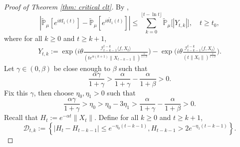 \documentclass[12pt,a4paper]{amsart}
\theoremstyle{plain}
\theoremstyle{definition}
\numberwithin{equation}{section}
\begin{document}
\begin{proof}[Proof of Theorem \ref{thm: critical clt}]
  By \cite[Lemma 3.4.3]{Durrett2010Probability},
  \begin{equation}
    \label{ineq: control of I1t}
    |\mathbb{\widetilde{P}}_{\mu}[e^{i\theta I_1(t)}] - \mathbb{\widetilde{P}}_{\mu} [e^{i\theta\widetilde{I}_1(t)}]|
    \leq \sum_{k=0}^{\lfloor t-\ln t \rfloor}\mathbb{\widetilde{P}}_{\mu}\big[|Y_{t,k}|\big],
    \quad t\geq t_0,
  \end{equation}
  where for all $k \geq 0$ and $t\geq k+1$,
  \begin{align}
    Y_{t,k}
    :=\exp\Big(i\theta\frac{\mathcal I_{t-k-1}^{t-k}\langle f ,X_t\rangle}{(t e^{\alpha(k+1)}\|X_{t-k-1}\|)^{\frac{1}{1+\beta}}}\Big)-\exp\Big(i\theta\frac{\mathcal I_{t-k-1}^{t-k}\langle f ,X_t\rangle}{(t\|X_t\|)^{\frac{1}{1+\beta}}}\Big).
  \end{align}
  Let $\gamma \in (0,\beta)$ be close enough to $\beta$ such that
  \[
    \frac{\alpha \gamma}{1+\gamma} > \frac{\alpha}{1+\gamma} - \frac{\alpha}{1+\beta} > 0.
  \]
  Fix this $\gamma$, then choose $\eta_0,\eta_1>0$ such that
  \[
    \frac{\alpha \gamma}{1+\gamma} >\eta_0 > \eta_0 - 3\eta_1 > \frac{\alpha}{1+\gamma} - \frac{\alpha}{1+\beta} > 0.
  \]
  Recall that $H_t := e^{-\alpha t}\|X_t\|$.
  Define for all $k \geq 0$ and $t\geq k+1$,
  \begin{equation}
    \label{def: Dtk}
    \mathcal{D}_{t,k}
    :=\left\{|H_t-H_{t-k-1}|\leq  e^{-\eta_0 (t-k-1)}, H_{t-k-1}> 2e^{-\eta_1(t-k-1)}\right\}.
  \end{equation}


\end{proof}
\end{document}
